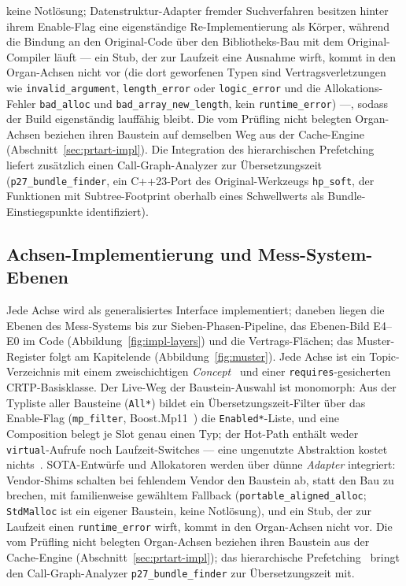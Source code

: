 \begin{nurlang}
keine Notlösung; Datenstruktur-Adapter fremder Suchverfahren besitzen hinter ihrem Enable-Flag eine
eigenständige Re-Implementierung als Körper, während die Bindung an den Original-Code über den
Bibliotheks-Bau mit dem Original-Compiler läuft --- ein Stub, der zur Laufzeit eine Ausnahme wirft,
kommt in den Organ-Achsen nicht vor (die dort geworfenen Typen sind Vertragsverletzungen wie
\texttt{invalid\_argument}, \texttt{length\_error} oder \texttt{logic\_error} und die
Allokations-Fehler \texttt{bad\_alloc} und \texttt{bad\_array\_new\_length}, kein
\texttt{runtime\_error}) ---, sodass der Build eigenständig lauffähig bleibt. Die vom
Prüfling nicht belegten Organ-Achsen beziehen ihren Baustein auf demselben Weg aus der Cache-Engine
(Abschnitt~\ref{sec:prtart-impl}). Die Integration des hierarchischen
Prefetching~\cite{zhang2025hierarchical} liefert zusätzlich einen Call-Graph-Analyzer zur Übersetzungszeit
(\texttt{p27\_bundle\_finder}, ein C++23-Port des Original-Werkzeugs \texttt{hp\_soft}, der Funktionen mit
Subtree-Footprint oberhalb eines Schwellwerts als Bundle-Einstiegspunkte identifiziert).
\end{nurlang}
\begin{nurkurz}
\section{Achsen-Implementierung und Mess-System-Ebenen}\label{sec:axes-impl}
Jede Achse wird als generalisiertes Interface implementiert; daneben liegen die Ebenen des Mess-Systems bis
zur Sieben-Phasen-Pipeline, das Ebenen-Bild E4--E0 im Code (Abbildung~\ref{fig:impl-layers}) und die
Vertrags-Flächen; das Muster-Register folgt am Kapitelende (Abbildung~\ref{fig:muster}). Jede Achse ist ein
Topic-Verzeichnis mit einem zweischichtigen \emph{Concept}~\cite{sutton2012concepts} und einer
\texttt{requires}-gesicherten CRTP-Basisklasse. Der Live-Weg der Baustein-Auswahl ist monomorph: Aus der
Typliste aller Bausteine (\texttt{All*}) bildet ein Übersetzungszeit-Filter über das Enable-Flag
(\texttt{mp\_filter}, Boost.Mp11~\cite{dimov_mp11}) die \texttt{Enabled*}-Liste, und eine Composition
belegt je Slot genau einen Typ; der Hot-Path enthält weder \texttt{virtual}-Aufrufe noch Laufzeit-Switches
--- eine ungenutzte Abstraktion kostet nichts~\cite{stroustrup2012foundations}. SOTA-Entwürfe und
Allokatoren werden über dünne \emph{Adapter} integriert: Vendor-Shims schalten bei fehlendem Vendor den
Baustein ab, statt den Bau zu brechen, mit familienweise gewähltem Fallback
(\texttt{portable\_aligned\_alloc}; \texttt{StdMalloc} ist ein eigener Baustein, keine Notlösung), und ein
Stub, der zur Laufzeit einen \texttt{runtime\_error} wirft, kommt in den Organ-Achsen nicht vor. Die vom
Prüfling nicht belegten Organ-Achsen beziehen ihren Baustein aus der Cache-Engine
(Abschnitt~\ref{sec:prtart-impl}); das hierarchische Prefetching~\cite{zhang2025hierarchical} bringt den
Call-Graph-Analyzer \texttt{p27\_bundle\_finder} zur Übersetzungszeit mit.
\end{nurkurz}

